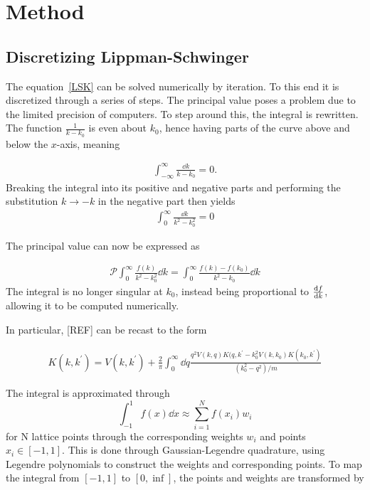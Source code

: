 \section{Method}\label{sec:Method}

\subsection{Discretizing Lippman-Schwinger}
\label{sec:discret}

The equation~\eqref{LSK} can be solved numerically by iteration. To this end it is
discretized through a series of steps. The principal value poses a problem due to the limited precision of computers.
To step around this, the integral is rewritten. The function
\(\frac{1}{k-k_{0}}\) is even about \(k_{0}\), hence having parts of the curve
above and below the \(x\)-axis, meaning

\begin{align*}
  \int_{-\infty}^{\infty}\frac{\dd k}{k-k_{0}} = 0.
\end{align*}
Breaking the integral into its positive and negative parts and performing the
substitution \(k\to -k\) in the negative part then yields
\begin{align*}
  \int_{0}^{\infty}\frac{\dd k}{k^{2}-k_{0}^{2}} = 0
\end{align*}

The principal value can now be expressed as

\begin{align*}
  \mathcal{P}\int_{0}^{\infty}\frac{f(k)}{k^{2}-k_{0}^{2}} \dd k = \int_{0}^{\infty}\frac{f(k)-f(k_{0})}{k^{2}-k_{0}}\dd k
\end{align*}
The integral is no longer singular at \(k_{0}\), instead being proportional to
\(\dv{f}{k}\), allowing it to be computed numerically.

In particular, [REF] can be recast to the form

\begin{align*}
  K(k, k^{\prime}) = V(k, k^{\prime}) + \frac{2}{\pi}\int_{0}^{\infty}
  \dd q \frac{q^{2}V(k,q)K(q,k^{\prime} - k^{2}_{0}V(k, k_{0})K(k_{0},k^{\prime})}{(k_{0}^{2}-q^{2})/m}
\end{align*}

The integral is approximated through
\begin{equation*}
  \int_{-1}^{1}f(x)\dd x \approx \sum_{i=1}^{N}f(x_{i})w_{i}
\end{equation*}
for N lattice points through the corresponding weights \(w_{i}\) and points
\(x_{i}\in [-1, 1]\). This is done through Gaussian-Legendre quadrature, using
Legendre polynomials to construct the weights and corresponding points. To map
the integral from \([-1, 1]\) to \([0, \inf]\), the points and weights are
transformed by

